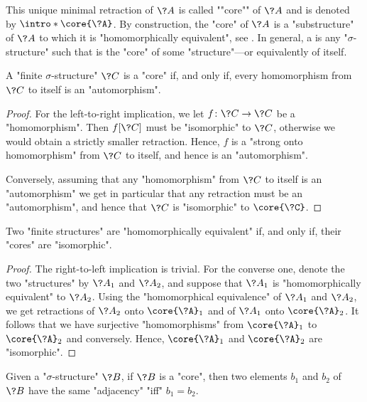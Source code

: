 This unique minimal retraction of $\?A$ is called \AP""core"" of $\?A$ and
is denoted by \AP$\intro*\core{\?A}$.
By construction, the "core" of $\?A$ is a "substructure" of $\?A$ to which it is "homomorphically equivalent", see .
In general, a  is any "$\sigma$-structure" such that is the "core" of
some "structure"---or equivalently of itself.

\begin{proposition}
	\AP\label{prop:core-iff-hom-are-auto}
	A "finite $\sigma$-structure" $\?C$ is a "core" if, and only if, every
	homomorphism from $\?C$ to itself is an "automorphism".
\end{proposition}

\begin{proof}
	For the left-to-right implication,
	we let $f\colon \?C \to \?C$ be a "homomorphism".
	Then $f[\?C]$ must be "isomorphic" to $\?C$, otherwise we would obtain
	a strictly smaller retraction. Hence, $f$ is a "strong onto homomorphism"
	from $\?C$ to itself, and hence is an "automorphism".
	
	Conversely, assuming that any "homomorphism" from $\?C$ to itself is an "automorphism"
	we get in particular that any retraction must be an "automorphism", and
	hence that $\?C$ is "isomorphic" to $\core{\?C}$.
\end{proof}

\begin{proposition}
	\AP\label{prop:equiv-core-isomorphic}
	Two "finite structures" are "homomorphically equivalent" if,
	and only if, their "cores" are "isomorphic".
\end{proposition}

\begin{proof}
	The right-to-left implication is trivial.
	For the converse one, denote the two "structures" by $\?A_1$ and $\?A_2$,
	and suppose that $\?A_1$ is "homomorphically equivalent" to $\?A_2$.
	Using the "homomorphical equivalence" of $\?A_1$ and $\?A_2$,
	we get retractions of $\?A_2$ onto $\core{\?A}_1$ and of $\?A_1$ onto $\core{\?A}_2$.
	It follows that we have surjective "homomorphisms" from $\core{\?A}_1$ to $\core{\?A}_2$
	and conversely. Hence, $\core{\?A}_1$ and $\core{\?A}_2$ are "isomorphic".
\end{proof}

\begin{proposition}
	\AP\label{prop:adjacency-core}
	Given a "$\sigma$-structure" $\?B$, if $\?B$ is a "core", then
	two elements $b_1$ and $b_2$ of $\?B$ have the same "adjacency" "iff" $b_1 = b_2$.
\end{proposition}

